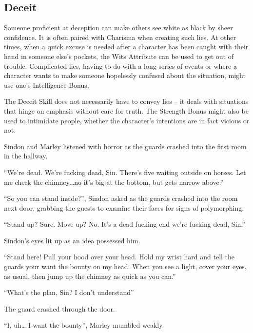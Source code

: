 \begin{multicols}{2}
{\begin{figure*}[b!]
\begin{boxtext}[title=Rolling with Bad Stats]
    \end{boxtext}
  \end{figure*}

}{}

\subsection{Deceit}

Someone proficient at deception can make others see white as black by sheer confidence. It is often paired with Charisma when creating such lies. At other times, when a quick excuse is needed after a character has been caught with their hand in someone else's pockets, the Wits Attribute can be used to get out of trouble. Complicated lies, having to do with a long series of events or where a character wants to make someone hopelessly confused about the situation, might use one's Intelligence Bonus.

The Deceit Skill does not necessarily have to convey lies -- it deals with situations that hinge on emphasis without care for truth.
The Strength Bonus might also be used to intimidate people, whether the character's intentions are in fact vicious or not.

\begin{exampletext}
  Sindon and Marley listened with horror as the guards crashed into the first room in the hallway.

  ``We're dead.
  We're fucking dead, Sin.
  There's five waiting outside on horses.
  Let me check the chimney\ldots no it's big at the bottom, but gets narrow above.''

  ``So you can stand inside?'', Sindon asked as the guards crashed into the room next door, grabbing the guests to examine their faces for signs of polymorphing.

  ``Stand up?
  Sure.
  Move up?
  No.
  It's a dead fucking end we're fucking dead, Sin.''

  Sindon's eyes lit up as an idea possessed him.

  ``Stand here!
  Pull your hood over your head.
  Hold my wrist hard and tell the guards your want the bounty on my head.
  When you see a light, cover your eyes, as usual, then jump up the chimney as quick as you can.''

  ``What's the plan, Sin?
  I don't understand''

  The guard crashed through the door.

  ``I, uh\ldots
  I want the bounty'', Marley mumbled weakly.


\end{exampletext}
\end{multicols}
